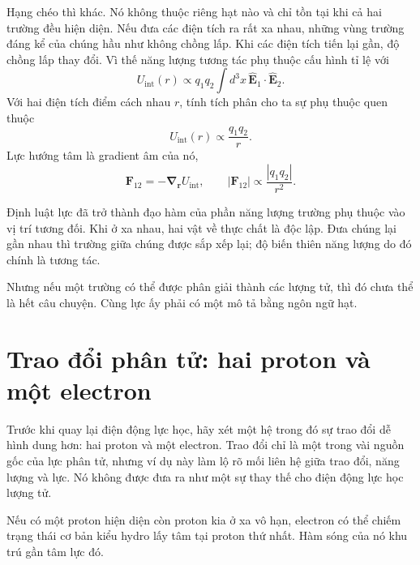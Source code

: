 Hạng chéo thì khác. Nó không thuộc riêng hạt nào và chỉ tồn tại khi cả hai trường đều hiện diện. Nếu đưa các điện tích ra rất xa nhau, những vùng trường đáng kể của chúng hầu như không chồng lấp. Khi các điện tích tiến lại gần, độ chồng lấp thay đổi. Vì thế năng lượng tương tác phụ thuộc cấu hình tỉ lệ với
\begin{equation}
U_{\text{int}}(r)\propto q_1q_2\int d^3x\,
\widehat{\mathbf E}_1\!\cdot\!\widehat{\mathbf E}_2.
\end{equation}
Với hai điện tích điểm cách nhau \(r\), tính tích phân cho ta sự phụ thuộc quen thuộc
\begin{equation}
U_{\text{int}}(r)\propto\frac{q_1q_2}{r}.
\end{equation}
Lực hướng tâm là gradient âm của nó,
\begin{equation}
\mathbf F_{12}=-\boldsymbol\nabla_{\mathbf r}U_{\text{int}},
\qquad
|\mathbf F_{12}|\propto\frac{|q_1q_2|}{r^2}.
\end{equation}

Định luật lực đã trở thành đạo hàm của phần năng lượng trường phụ thuộc vào vị trí tương đối. Khi ở xa nhau, hai vật về thực chất là độc lập. Đưa chúng lại gần nhau thì trường giữa chúng được sắp xếp lại; độ biến thiên năng lượng do đó chính là tương tác.

Nhưng nếu một trường có thể được phân giải thành các lượng tử, thì đó chưa thể là hết câu chuyện. Cùng lực ấy phải có một mô tả bằng ngôn ngữ hạt.

\section{Trao đổi phân tử: hai proton và một electron}

Trước khi quay lại điện động lực học, hãy xét một hệ trong đó sự trao đổi dễ hình dung hơn: hai proton và một electron. Trao đổi chỉ là một trong vài nguồn gốc của lực phân tử, nhưng ví dụ này làm lộ rõ mối liên hệ giữa trao đổi, năng lượng và lực. Nó không được đưa ra như một sự thay thế cho điện động lực học lượng tử.

Nếu có một proton hiện diện còn proton kia ở xa vô hạn, electron có thể chiếm trạng thái cơ bản kiểu hydro lấy tâm tại proton thứ nhất. Hàm sóng của nó khu trú gần tâm lực đó.

